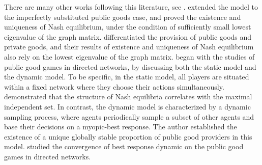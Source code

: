There are many other works following this literature, see \citep{public-network-follow:bramoulle2014strategic, public-network-follow:boncinelli2012stochastic,public-network:allouch2015private,public-network:elliott2021network}.
\citet{public-network-follow:bramoulle2014strategic} extended the model to the imperfectly substituted
public goods case, and proved the existence and uniqueness of Nash equilibrium, under the condition of sufficiently small lowest eigenvalue of the graph matrix.
\citet{public-network:allouch2015private} differentiated the provision of public goods and private goods, and their results of existence and uniqueness of Nash equilibrium also rely on the lowest eigenvalue of the graph matrix.
\citet{public-network-direct:lopez2013public} began with the studies of public good games in directed networks, by discussing both the static model and the dynamic model. To be specific, in the static model, all players are situated within a fixed network where they choose their actions simultaneously. \citet{public-network-direct:lopez2013public} demonstrated that the structure of Nash equilibria correlates with the maximal independent set. In contrast, the dynamic model is characterized by a dynamic sampling process, where agents periodically sample a subset of other agents and base their decisions on a myopic-best response. The author established the existence of a unique globally stable proportion of public good providers in this model. \citet{public-network-direct-BRD:bayer2023best} studied the convergence of best response dynamic on the public good games in directed networks.

